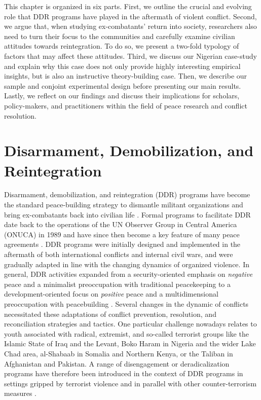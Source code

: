 This chapter is organized in six parts. First, we outline the crucial and evolving role that DDR programs have played in the aftermath of violent conflict. Second, we argue that, when studying ex-combatants' return into society, researchers also need to turn their focus to the communities and carefully examine civilian attitudes towards reintegration. To do so, we present a two-fold typology of factors that may affect these attitudes. Third, we discuss our Nigerian case-study and explain why this case does not only provide highly interesting empirical insights, but is also an instructive theory-building case. Then, we describe our sample and conjoint experimental design before presenting our main results. Lastly, we reflect on our findings and discuss their implications for scholars, policy-makers, and practitioners within the field of peace research and conflict resolution.


\section{Disarmament, Demobilization, and Reintegration}

Disarmament, demobilization, and reintegration (DDR) programs have become the standard peace-building strategy to dismantle militant organizations and bring ex-combatants back into civilian life \citep{Berdal1996}. Formal programs to facilitate DDR date back to the operations of the UN Observer Group in Central America (ONUCA) in 1989 \citep{Humphreys2007} and have since then become a key feature of many peace agreements \citep{Gilligan2012}. DDR programs were initially designed and implemented in the aftermath of both international conflicts and internal civil wars, and were gradually adapted in line with the changing dynamics of organized violence. In general, DDR activities expanded from a security-oriented emphasis on \textit{negative} peace and a minimalist preoccupation with traditional peacekeeping to a development-oriented focus on\textit{ positive} peace and a multidimensional preoccupation with peacebuilding \citep{Galtung1969, Muggah2016}. Several changes in the dynamic of conflicts necessitated these adaptations of conflict prevention, resolution, and reconciliation strategies and tactics. One particular challenge nowadays relates to youth associated with radical, extremist, and so-called terrorist groups like the Islamic State of Iraq and the Levant, Boko Haram in Nigeria and the wider Lake Chad area, al-Shabaab in Somalia and Northern Kenya, or the Taliban in Afghanistan and Pakistan. A range of disengagement or deradicalization programs have therefore been introduced in the context of DDR programs in settings gripped by terrorist violence and in parallel with other counter-terrorism measures \citep{Muggah2016}.


